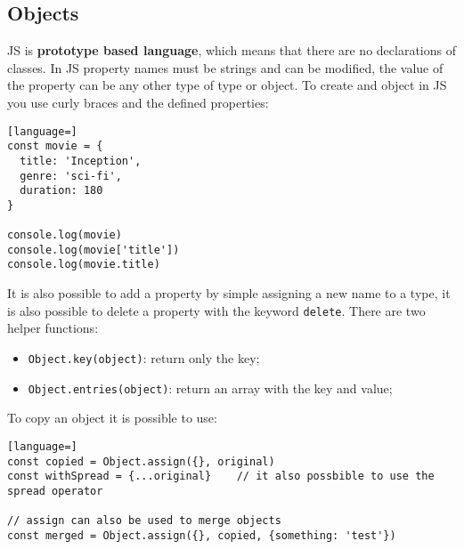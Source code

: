 \documentclass[12pt]{article}
\begin{document}
\subsection{Objects}
JS is \textbf{prototype based language}, which means that there are no declarations of classes. In JS property names must be strings and can be modified, the value of the property can be any other type of type or object. To create and object in JS you use curly braces and the defined properties:
\begin{lstlisting}[language=]
const movie = {
  title: 'Inception',
  genre: 'sci-fi',
  duration: 180
}

console.log(movie)
console.log(movie['title'])
console.log(movie.title)
\end{lstlisting}
It is also possible to add a property by simple assigning a new name to a type, it is also possible to delete a property with the keyword \texttt{delete}. There are two helper functions:
\begin{itemize}
  \item \texttt{Object.key(object)}: return only the key;
  \item \texttt{Object.entries(object)}: return an array with the key and value;
\end{itemize}
To copy an object it is possible to use:
\begin{lstlisting}[language=]
const copied = Object.assign({}, original)
const withSpread = {...original}    // it also possbible to use the spread operator

// assign can also be used to merge objects
const merged = Object.assign({}, copied, {something: 'test'})
\end{lstlisting}
\end{document}
